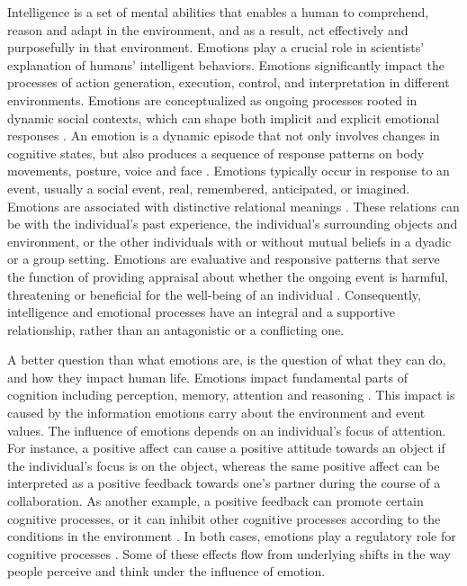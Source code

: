 \documentclass[12pt]{report}
\begin{document}
Intelligence is a set of mental abilities that enables a human to comprehend,
reason and adapt in the environment, and as a result, act effectively and
purposefully in that environment. Emotions play a crucial role in
scientists' explanation of humans' intelligent behaviors. Emotions significantly
impact the processes of action generation, execution, control, and
interpretation \cite{zhu:emotion-action} in different environments. Emotions are
conceptualized as ongoing processes rooted in dynamic social contexts, which can
shape both implicit and explicit emotional responses
\cite{parkinson:emotion-social-interaction}. An emotion is a dynamic episode
that not only involves changes in cognitive states, but also produces a sequence
of response patterns on body movements, posture, voice and face
\cite{scherer:expression-appraisal}. Emotions typically occur in response to an
event, usually a social event, real, remembered, anticipated, or imagined.
Emotions are associated with distinctive relational meanings
\cite{parkinson:holds-emotion}. These relations can be with the individual's
past experience, the individual's surrounding objects and environment, or the
other individuals with or without mutual beliefs in a dyadic or a group setting.
Emotions are evaluative and responsive patterns that serve the function of
providing appraisal about whether the ongoing event is harmful, threatening or
beneficial for the well-being of an individual \cite{zhu:emotion-action}.
Consequently, intelligence and emotional processes have an integral and a
supportive relationship, rather than an antagonistic or a conflicting one.

A better question than what emotions are, is the question of what they can
do, and how they impact human life. Emotions impact fundamental parts of
cognition including perception, memory, attention and reasoning
\cite{clore:judgement-regulation}. This impact is caused by the information
emotions carry about the environment and event values. The influence of emotions
depends on an individual's focus of attention. For instance, a positive affect
can cause a positive attitude towards an object if the individual's focus is on
the object, whereas the same positive affect can be interpreted as a positive
feedback towards one's partner during the course of a collaboration. As another
example, a positive feedback can promote certain cognitive processes, or it can
inhibit other cognitive processes according to the conditions in the environment
\cite{clore:affective-guidance}. In both cases, emotions play a regulatory role
for cognitive processes \cite{gross:emotion-generation-regulation}. Some of
these effects flow from underlying shifts in the way people perceive and think
under the influence of emotion.
\end{document}

